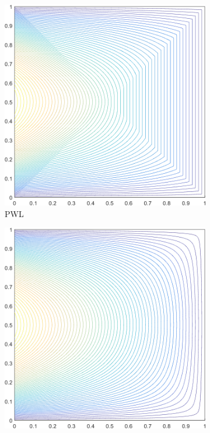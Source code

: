 \begin{figure}
\begin{subfigure}[b]{0.39\textwidth}
		\includegraphics[width=\textwidth]{figures/sec_BF/square_PWLD2_contour_b8.png}
		\caption{PWL}
	\end{subfigure}
	\vfill
	\begin{subfigure}[b]{0.39\textwidth}
		\centering
		\includegraphics[width=\textwidth]{figures/sec_BF/square_MV2_contour_b8.png}

\end{subfigure}
\end{figure}
